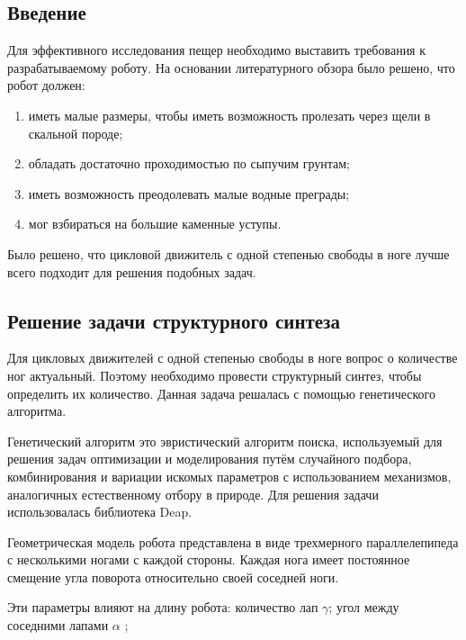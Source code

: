 \subsection{Введение}
Для эффективного исследования пещер необходимо выставить требования к разрабатываемому роботу. На основании литературного обзора было решено, что робот должен:
\begin{enumerate}
    \item иметь малые размеры, чтобы иметь возможность пролезать через щели в скальной породе;
    \item обладать достаточно проходимостью по сыпучим грунтам;
    \item иметь возможность преодолевать малые водные преграды;
    \item мог взбираться на большие каменные уступы.
\end{enumerate}

Было решено, что цикловой движитель с одной степенью свободы в ноге лучше всего подходит для решения подобных задач.


\subsection{Решение задачи структурного синтеза}
Для цикловых движителей с одной степенью свободы в ноге вопрос о количестве ног актуальный. Поэтому необходимо провести структурный синтез, чтобы определить их количество. Данная задача решалась с помощью генетического алгоритма.

Генетический алгоритм это эвристический алгоритм поиска, используемый для решения задач оптимизации и моделирования путём случайного подбора, комбинирования и вариации искомых параметров с использованием механизмов, аналогичных естественному отбору в природе. Для решения задачи использовалась библиотека Deap.

Геометрическая модель робота представлена в виде трехмерного параллелепипеда с несколькими ногами с каждой стороны. Каждая нога имеет постоянное смещение угла поворота относительно своей соседней ноги.

Эти параметры влияют на длину робота:
количество лап  $\gamma$; угол между соседними лапами  $\alpha$ ;

